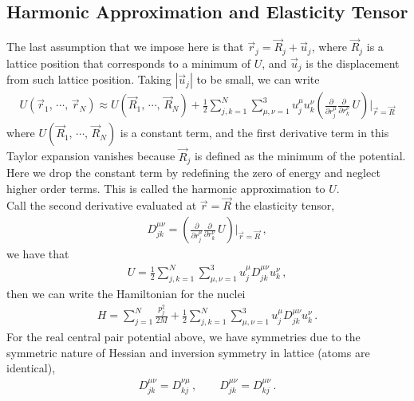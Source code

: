 \documentclass[11pt, oneside]{book}
\theoremstyle{break}
\theoremstyle{break}
\newcommand{\pd}{\partial}
\begin{document}
\subsection{Harmonic Approximation and Elasticity Tensor}
The last assumption that we impose here is that $\vec{r}_j = \vec{R}_j + \vec{u}_j$, where $\vec{R}_j$ is a lattice position that corresponds to a minimum of $U$, and $\vec{u}_j$ is the displacement from such lattice position. Taking $|\vec{u}_j|$ to be small, we can write 
\begin{align*}
U(\vec{r}_1,\, \cdots,\, \vec{r}_N) \approx U(\vec{R}_1,\, \cdots,\, \vec{R}_N) + \frac{1}{2}\sum_{j,k=1}^N\sum_{\mu,\nu=1}^3u_j^{\mu} u_k^{\nu}\left(
\frac{\pd}{\pd r_j^\mu}\frac{\pd}{\pd r_k^\nu}\, U
\right)|_{\vec{r}=\vec{R}}
\end{align*}
where $U(\vec{R}_1,\, \cdots,\, \vec{R}_N)$ is a constant term, and the first derivative term in this Taylor expansion vanishes because $\vec{R}_j$ is defined as the minimum of the potential.\\

Here we drop the constant term by redefining the zero of energy and neglect higher order terms. This is called the harmonic approximation to $U$. \\

Call the second derivative evaluated at $\vec{r} = \vec{R}$ the elasticity tensor,
\begin{align*}
D_{jk}^{\mu\nu} = \left( 
\frac{\pd}{\pd r_j^\mu}\frac{\pd}{\pd r_k^\nu}\, U\right)|_{\vec{r} = \vec{R}}\,,
\end{align*}
we have that 
\begin{align*}
U = \frac{1}{2} \sum_{j,k=1}^N\sum_{\mu,\nu=1}^3 u_j^\mu D_{jk}^{\mu\nu}u_k^{\nu}\,,
\end{align*}
then we can write the Hamiltonian for the nuclei
\begin{align*}
H = \sum_{j=1}^N \frac{p_j^2}{2M} + \frac{1}{2}\sum_{j,k=1}^N\sum_{\mu,\nu=1}^3 u_j^\mu D_{jk}^{\mu\nu}u_k^{\nu}\,.
\end{align*}
For the real central pair potential above, we have symmetries due to the symmetric nature of Hessian and inversion symmetry in lattice (atoms are identical),
\begin{align*}
D_{jk}^{\mu\nu} = D_{kj}^{\nu\mu}\,,\qquad
D_{jk}^{\mu\nu} = D_{kj}^{\mu\nu}\,.
\end{align*}
\end{document}
